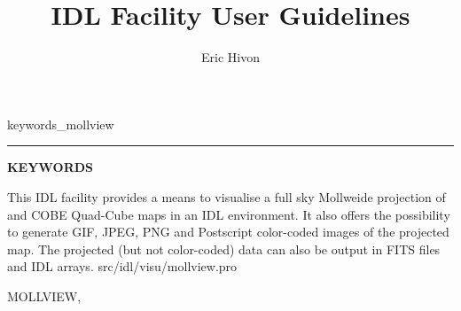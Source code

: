 

\sloppy

\title{\healpix IDL Facility User Guidelines}
 \section[mollview]{ }
\label{idl:\thedocid}
\author{Eric Hivon}



  \newenvironment{qualifiers_mollview}
    {\rule{\hsize}{0.7mm}
     \textsc{\Large{\textbf{QUALIFIERS}}}\hfill\newline%
	\renewcommand{\arraystretch}{1.5}%
	}

  \newenvironment{keywords_mollview}
    {\rule{\hsize}{0.7mm}
     \textsc{\Large{\textbf{KEYWORDS}}}\hfill\newline%
	\renewcommand{\arraystretch}{1.5}%
	}


\newcommand{\sizeone}{0.19\hsize}
\newcommand{\sizetwo}{0.08\hsize}
\newcommand{\sizethr}{0.70\hsize}

\begin{facility}
{This IDL facility provides a means to visualise a full sky Mollweide projection of
\healpix and COBE Quad-Cube maps in an IDL environment. 
It also offers the possibility to
generate GIF, JPEG, PNG and Postscript color-coded images of the projected map. 
The projected (but not color-coded) data can also be output in FITS files and
IDL arrays.}
{src/idl/visu/mollview.pro}
\end{facility}

\newcommand{\mollbacktotop}{\latexhtml{%
}{
\mylink{idl:mollview:TOP}{Back to Format}%
}}


\begin{IDLformat}
{MOLLVIEW, %
%
\normalsize{
}
}
\end{IDLformat}

